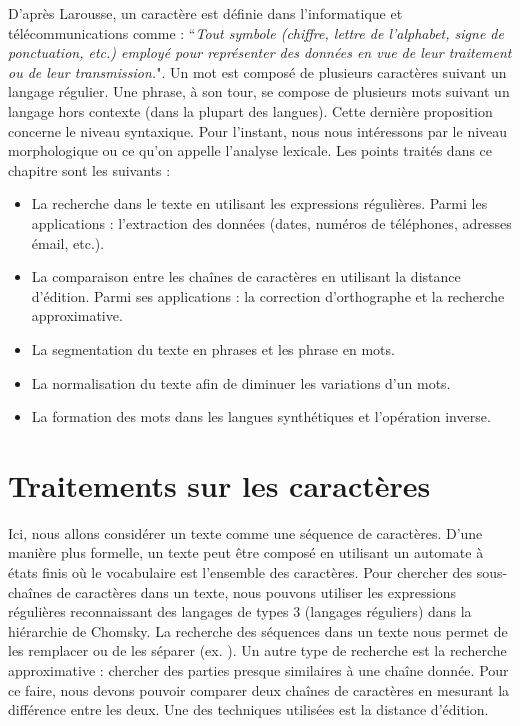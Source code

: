 \documentclass{KodeBook}
\begin{document}
D'après Larousse, un caractère est définie dans l'informatique et télécommunications comme : ``\textit{Tout symbole (chiffre, lettre de l'alphabet, signe de ponctuation, etc.) employé pour représenter des données en vue de leur traitement ou de leur transmission.}".
Un mot est composé de plusieurs caractères suivant un langage régulier. 
Une phrase, à son tour, se compose de plusieurs mots suivant un langage hors contexte (dans la plupart des langues). 
Cette dernière proposition concerne le niveau syntaxique.
Pour l'instant, nous nous intéressons par le niveau morphologique ou ce qu'on appelle l'analyse lexicale.
Les points traités dans ce chapitre sont les suivants : 
\begin{itemize}
	\item La recherche dans le texte en utilisant les expressions régulières. 
	Parmi les applications : l'extraction des données (dates, numéros de téléphones, adresses émail, etc.).
	
	\item La comparaison entre les chaînes de caractères en utilisant la distance d'édition. 
	Parmi ses applications : la correction d'orthographe et la recherche approximative.
	
	\item La segmentation du texte en phrases et les phrase en mots. 
	
	\item La normalisation du texte afin de diminuer les variations d'un mots.
	
	\item La formation des mots dans les langues synthétiques et l'opération inverse.
\end{itemize}

\section{Traitements sur les caractères}

Ici, nous allons considérer un texte comme une séquence de caractères. 
D'une manière plus formelle, un texte peut être composé en utilisant un automate à états finis où le vocabulaire est l'ensemble des caractères. 
Pour chercher des sous-chaînes de caractères dans un texte, nous pouvons utiliser les expressions régulières reconnaissant des langages de types 3 (langages réguliers) dans la hiérarchie de Chomsky. 
La recherche des séquences dans un texte nous permet de les remplacer ou de les séparer (ex. ).
Un autre type de recherche est la recherche approximative : chercher des parties presque similaires à une chaîne donnée. 
Pour ce faire, nous devons pouvoir comparer deux chaînes de caractères en mesurant la différence entre les deux. 
Une des techniques utilisées est la distance d'édition.
\end{document}
